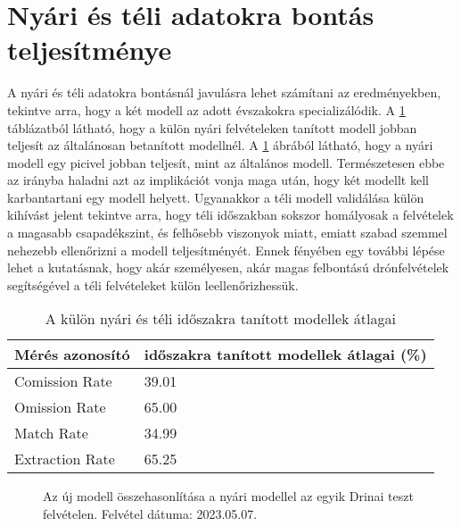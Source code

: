 \section{Nyári és téli adatokra bontás teljesítménye}
\label{ch:summer-winter-models}

A nyári és téli adatokra bontásnál javulásra lehet számítani az eredményekben, tekintve arra, hogy a két modell az adott évszakokra specializálódik. A \ref{tab:summer-winter-split} táblázatból  látható, hogy a külön nyári felvételeken tanított modell jobban teljesít az általánosan betanított modellnél. A \ref{fig:summer-vs-new} ábrából látható, hogy a nyári modell egy picivel jobban teljesít, mint az általános modell. Természetesen ebbe az irányba haladni azt az implikációt vonja maga után, hogy két modellt kell karbantartani egy modell helyett. Ugyanakkor a téli modell validálása külön kihívást jelent tekintve arra, hogy téli időszakban sokszor homályosak a felvételek a magasabb csapadékszint, és felhősebb viszonyok miatt, emiatt szabad szemmel nehezebb ellenőrizni a modell teljesítményét. Ennek fényében egy további lépése lehet a kutatásnak, hogy akár személyesen, akár magas felbontású drónfelvételek segítségével a téli felvételeket külön leellenőrizhessük. 

\begin{table}[H]
	\centering
	\begin{tabular}{ | p{} | p{} | }
		\hline
		\textbf{Mérés azonosító} & \textbf{időszakra tanított modellek átlagai (\%)} \\
		\hline \hline
		Comission Rate & 39.01 \\
		\hline
		Omission Rate & 65.00 \\
		\hline
		Match Rate & 34.99  \\
		\hline
        Extraction Rate & 65.25 \\
		\hline
	\end{tabular}
	\caption{A külön nyári és téli időszakra tanított modellek átlagai}
	\label{tab:summer-winter-split}
\end{table}

\begin{figure}[H]
	\centering
	\hspace{5pt}
	\hspace{5pt}
	\caption{Az új modell összehasonlítása a nyári modellel az egyik Drinai teszt felvételen. Felvétel dátuma: 2023.05.07.}
	\label{fig:summer-vs-new}
\end{figure}


